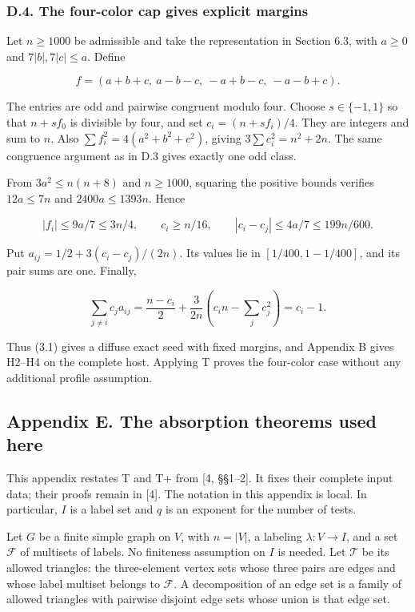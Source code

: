 \documentclass[english,11pt,a4paper]{article}
\begin{document}
\subsubsection{D.4. The four-color cap gives explicit margins}\label{d.4.-the-four-color-cap-gives-explicit-margins}

Let \(n\ge1000\) be admissible and take the representation in Section 6.3, with \(a\ge0\) and \(7|b|,7|c|\le a\). Define

\[f=(a+b+c,\ a-b-c,\ -a+b-c,\ -a-b+c).\]

The entries are odd and pairwise congruent modulo four. Choose \(s\in\{-1,1\}\) so that \(n+sf_0\) is divisible by four, and set \(c_i=(n+sf_i)/4\). They are integers and sum to \(n\). Also \(\sum f_i^2=4(a^2+b^2+c^2)\), giving \(3\sum c_i^2=n^2+2n\). The same congruence argument as in D.3 gives exactly one odd class.

From \(3a^2\le n(n+8)\) and \(n\ge1000\), squaring the positive bounds verifies \(12a\le7n\) and \(2400a\le1393n\). Hence

\[|f_i|\le9a/7\le3n/4,\qquad c_i\ge n/16,\qquad |c_i-c_j|\le4a/7\le199n/600.\]

Put \(a_{ij}=1/2+3(c_i-c_j)/(2n)\). Its values lie in \([1/400,1-1/400]\), and its pair sums are one. Finally,

\[\sum_{j\ne i}c_ja_{ij}=\frac{n-c_i}{2}+\frac{3}{2n}\left(c_in-\sum_jc_j^2\right)=c_i-1.\]

Thus (3.1) gives a diffuse exact seed with fixed margins, and Appendix B gives H2--H4 on the complete host. Applying T proves the four-color case without any additional profile assumption.

\subsection{Appendix E. The absorption theorems used here}\label{appendix-e.-the-absorption-theorems-used-here}

This appendix restates T and T+ from {[}4, §§1--2{]}. It fixes their complete input data; their proofs remain in {[}4{]}. The notation in this appendix is local. In particular, \(I\) is a label set and \(q\) is an exponent for the number of tests.

Let \(G\) be a finite simple graph on \(V\), with \(n=|V|\), a labeling \(\lambda:V\to I\), and a set \(\mathcal F\) of multisets of labels. No finiteness assumption on \(I\) is needed. Let \(\mathcal T\) be its allowed triangles: the three-element vertex sets whose three pairs are edges and whose label multiset belongs to \(\mathcal F\). A decomposition of an edge set is a family of allowed triangles with pairwise disjoint edge sets whose union is that edge set.
\end{document}
